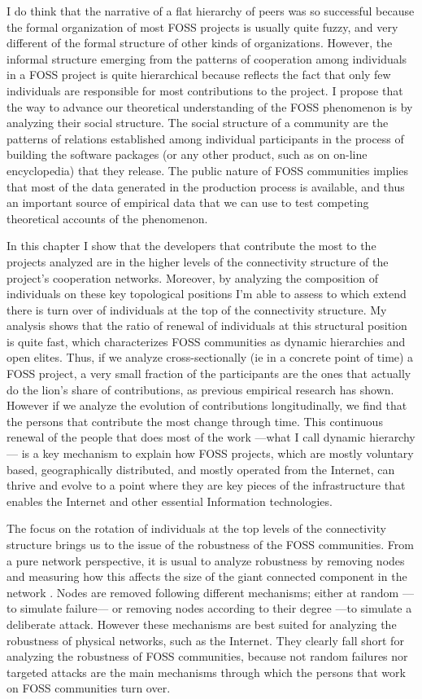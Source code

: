 I do think that the narrative of a flat hierarchy of peers was so successful because the formal organization of most FOSS projects is usually quite fuzzy, and very different of the formal structure of other kinds of organizations. However, the informal structure emerging from the patterns of cooperation among individuals in a FOSS project is quite hierarchical because reflects the fact that only few individuals are responsible for most contributions to the project. I propose that the way to advance our theoretical understanding of the FOSS phenomenon is by analyzing their social structure. The social structure of a community are the patterns of relations established among individual participants in the process of building the software packages (or any other product, such as on on-line encyclopedia) that they release. The public nature of FOSS communities implies that most of the data generated in the production process is available, and thus an important source of empirical data that we can use to test competing theoretical accounts of the phenomenon. 

In this chapter I show that the developers that contribute the most to the projects analyzed are in the higher levels of the connectivity structure of the project's cooperation networks. Moreover, by analyzing the composition of individuals on these key topological positions I'm able to assess to which extend there is turn over of individuals at the top of the connectivity structure. My analysis shows that the ratio of renewal of individuals at this structural position is quite fast, which characterizes FOSS communities as dynamic hierarchies and open elites. Thus, if we analyze cross-sectionally (ie in a concrete point of time) a FOSS project, a very small fraction of the participants are the ones that actually do the lion's share of contributions, as previous empirical research has shown. However if we analyze the evolution of contributions longitudinally, we find that the persons that contribute the most change through time. This continuous renewal of the people that does most of the work ---what I call dynamic hierarchy--- is a key mechanism to explain how FOSS projects, which are mostly voluntary based, geographically distributed, and mostly operated from the Internet, can thrive and evolve to a point where they are key pieces of the infrastructure that enables the Internet and other essential Information technologies.

The focus on the rotation of individuals at the top levels of the connectivity structure brings us to the issue of the robustness of the FOSS communities. From a pure network perspective, it is usual to analyze robustness by removing nodes and measuring how this affects the size of the giant connected component in the network \citep{albert:2000}. Nodes are removed following different mechanisms; either at random ---to simulate failure--- or removing nodes according to their degree ---to simulate a deliberate attack. However these mechanisms are best suited for analyzing the robustness of physical networks, such as the Internet. They clearly fall short for analyzing the robustness of FOSS communities, because not random failures nor targeted attacks are the main mechanisms through which the persons that work on FOSS communities turn over.

